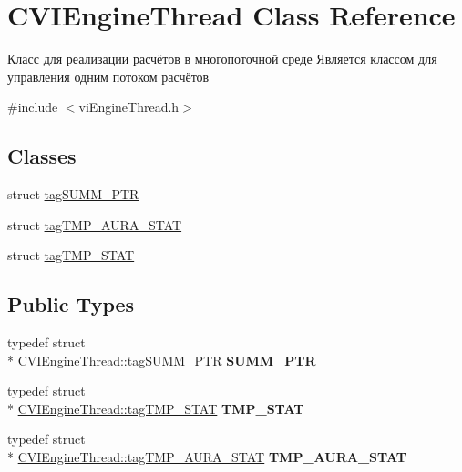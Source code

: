 \hypertarget{class_c_v_i_engine_thread}{\section{C\+V\+I\+Engine\+Thread Class Reference}
\label{class_c_v_i_engine_thread}
}


Класс для реализации расчётов в многопоточной среде Является классом для управления одним потоком расчётов  




{\ttfamily \#include $<$vi\+Engine\+Thread.\+h$>$}

\subsection*{Classes}
\begin{DoxyCompactItemize}
\item 
struct \hyperlink{struct_c_v_i_engine_thread_1_1tag_s_u_m_m___p_t_r}{tag\+S\+U\+M\+M\+\_\+\+P\+T\+R}
\item 
struct \hyperlink{struct_c_v_i_engine_thread_1_1tag_t_m_p___a_u_r_a___s_t_a_t}{tag\+T\+M\+P\+\_\+\+A\+U\+R\+A\+\_\+\+S\+T\+A\+T}
\item 
struct \hyperlink{struct_c_v_i_engine_thread_1_1tag_t_m_p___s_t_a_t}{tag\+T\+M\+P\+\_\+\+S\+T\+A\+T}
\end{DoxyCompactItemize}
\subsection*{Public Types}
\begin{DoxyCompactItemize}
\item 
\hypertarget{class_c_v_i_engine_thread_adaf393bce3e0f8abe027cbfae7acfffb}{typedef struct \\*
\hyperlink{struct_c_v_i_engine_thread_1_1tag_s_u_m_m___p_t_r}{C\+V\+I\+Engine\+Thread\+::tag\+S\+U\+M\+M\+\_\+\+P\+T\+R} {\bfseries S\+U\+M\+M\+\_\+\+P\+T\+R}}\label{class_c_v_i_engine_thread_adaf393bce3e0f8abe027cbfae7acfffb}

\item 
\hypertarget{class_c_v_i_engine_thread_a963dcd94cfc9dd191a6c4dc50458797f}{typedef struct \\*
\hyperlink{struct_c_v_i_engine_thread_1_1tag_t_m_p___s_t_a_t}{C\+V\+I\+Engine\+Thread\+::tag\+T\+M\+P\+\_\+\+S\+T\+A\+T} {\bfseries T\+M\+P\+\_\+\+S\+T\+A\+T}}\label{class_c_v_i_engine_thread_a963dcd94cfc9dd191a6c4dc50458797f}

\item 
\hypertarget{class_c_v_i_engine_thread_a07cb3ebb98282ee62c81cf9b257e335c}{typedef struct \\*
\hyperlink{struct_c_v_i_engine_thread_1_1tag_t_m_p___a_u_r_a___s_t_a_t}{C\+V\+I\+Engine\+Thread\+::tag\+T\+M\+P\+\_\+\+A\+U\+R\+A\+\_\+\+S\+T\+A\+T} {\bfseries T\+M\+P\+\_\+\+A\+U\+R\+A\+\_\+\+S\+T\+A\+T}}\label{class_c_v_i_engine_thread_a07cb3ebb98282ee62c81cf9b257e335c}

\end{DoxyCompactItemize}
